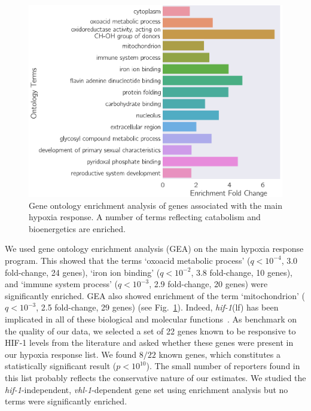 \documentclass[9pt,twocolumn,twoside]{pnas-new}
\newcommand{\qval}[1]{$q<10^{-#1}$}
\newcommand{\gene}[1]{\emph{#1}}
\newcommand{\hif}{\emph{\mbox{hif-1}}(lf)}
\newcommand{\hifp}{HIF-1}
\begin{document}
\begin{figure}[tbhp]
\centering
\includegraphics[width=\linewidth]{figs/hypoxia_response_gea.pdf}
\caption{
Gene ontology enrichment analysis of genes associated with the main hypoxia response.
A number of terms reflecting catabolism and bioenergetics are enriched.
}
\label{fig:hyp_gea}
\end{figure}

We used gene ontology enrichment analysis (GEA) on the main hypoxia response program.
This showed that the terms `oxoacid metabolic process' (\qval{4}, 3.0 fold-change,
24 genes), `iron ion binding' (\qval{2}, 3.8 fold-change, 10 genes), and `immune
system process' (\qval{3}, 2.9 fold-change, 20 genes) were significantly enriched.
GEA also showed enrichment of the term `mitochondrion' (\qval{3}, 2.5 fold-change,
29 genes) (see Fig.~\ref{fig:hyp_gea}). Indeed, \hif{} has been implicated in
all of these biological and molecular functions~\cite{Luhachack2012,Ackerman2012,
Romney2011,Semenza2011}.
As benchmark on the quality of our data, we selected a set of 22 genes known to
be responsive to \hifp{} levels from the literature and asked whether these genes
were present in our hypoxia response list. We found $8/22$ known genes, which
constitutes a statistically significant result ($p<10^{10}$). The small number of
reporters found in this list probably reflects the conservative nature of our
estimates.
We studied the \gene{hif-1}-independent, \gene{vhl-1}-dependent gene set
using enrichment analysis but no terms were significantly enriched.
\end{document}
